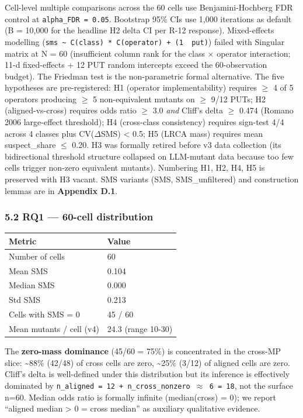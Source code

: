 \documentclass[review,12pt,authoryear]{elsarticle}
\newcounter{none}                   %
\begin{document}
Cell-level multiple comparisons across the 60 cells use
Benjamini-Hochberg FDR control at \texttt{alpha\_FDR\ =\ 0.05}.
Bootstrap 95\% CIs use 1,000 iterations as default (B = 10,000 for the
headline H2 delta CI per R-12 response). Mixed-effects modelling
(\texttt{sms\ \textasciitilde{}\ C(class)\ *\ C(operator)\ +\ (1\ \textbar{}\ put)})
failed with Singular matrix at N = 60 (insufficient column rank for the
class $\times$ operator interaction; 11-d fixed-effects + 12 PUT random
intercepts exceed the 60-observation budget). The Friedman test is the
non-parametric formal alternative. The five hypotheses are
pre-registered: H1 (operator implementability) requires $\geq$ 4 of 5
operators producing $\geq$ 5 non-equivalent mutants on $\geq$ 9/12 PUTs; H2
(aligned-vs-cross) requires odds ratio $\geq$ 3.0 \emph{and} Cliff's delta $\geq$
0.474 (Romano 2006 large-effect threshold); H4 (cross-class consistency)
requires sign-test 4/4 across 4 classes plus CV($\Delta$SMS) \textless{} 0.5;
H5 (LRCA mass) requires mean suspect\_share $\leq$ 0.20. H3 was formally
retired before v3 data collection (its bidirectional threshold structure
collapsed on LLM-mutant data because too few cells trigger non-zero
equivalent mutants). Numbering H1, H2, H4, H5 is preserved with H3
vacant. SMS variants (SMS, SMS\_unfiltered) and construction lemmas are
in \textbf{Appendix D.1}.

\subsubsection{5.2 RQ1 --- 60-cell
distribution}\label{rq1-60-cell-distribution}

{\def\LTcaptype{none} %
\begin{longtable}[]{@{}ll@{}}
\toprule\noalign{}
Metric & Value \\
\midrule\noalign{}
\endhead
\bottomrule\noalign{}
\endlastfoot
Number of cells & 60 \\
Mean SMS & 0.104 \\
Median SMS & 0.000 \\
Std SMS & 0.213 \\
Cells with SMS = 0 & 45 / 60 \\
Mean mutants / cell (v4) & 24.3 (range 10-30) \\
\end{longtable}
}

The \textbf{zero-mass dominance} (45/60 = 75\%) is concentrated in the
cross-MP slice: \textasciitilde88\% (42/48) of cross cells are zero,
\textasciitilde25\% (3/12) of aligned cells are zero. Cliff's delta is
well-defined under this distribution but its inference is effectively
dominated by
\texttt{n\_aligned\ =\ 12\ +\ n\_cross\_nonzero\ $\approx$\ 6\ =\ 18}, not the
surface n=60. Median odds ratio is formally infinite (median(cross) =
0); we report ``aligned median \textgreater{} 0 = cross median'' as
auxiliary qualitative evidence.
\end{document}
